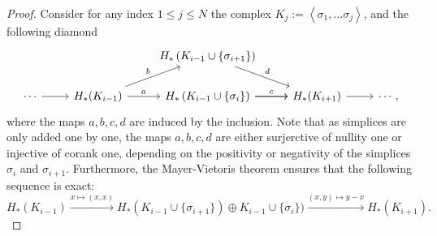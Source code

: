 \documentclass{article}
\begin{document}
\begin{proof}
		Consider for any index $1\le j \le N$ the complex $K_j := \left< \sigma_1, \dots \sigma_j \right>$, and the following diamond
		\begin{equation}
			\begin{tikzcd}
				&                                           & H_*\left(K_{i-1}\cup\left\{\sigma_{i+1}\right\}\right) \arrow[rd, "d"]      &                       &        \\
				\cdots \arrow[r] & H_*(K_{i-1}) \arrow[r, "a"] \arrow[ru, "b"] & H_*\left(K_{i-1}\cup\left\{\sigma_i\right\}\right) \arrow[r] \arrow[r, "c"] &  H_*(K_{i+1}) \arrow[r] & \cdots,
				\label{eq:vineyard_diamond}
			\end{tikzcd}
		\end{equation}
		where the maps $a,b,c,d$ are induced by the inclusion.
		Note that as simplices are only added one by one, the maps $a,b,c,d$ are
		either surjerctive of nullity one or injective of corank one, depending on the positivity or negativity of the simplices $\sigma_i$ and $\sigma_{i+1}$.
		Furthermore, the Mayer-Vietoris theorem ensures that the following sequence is exact:
		\begin{equation*}
			H_*(K_{i-1})
		\xrightarrow{x\mapsto (x,x)}{H_*(K_{i-1}\cup \{\sigma_{i+1}\})\oplus K_{i-1}\cup \{\sigma_{i}\})}
		\xrightarrow{(x,y)\mapsto y-x}{H_*(K_{i+1})}.
	\end{equation*}


\end{proof}
\end{document}
